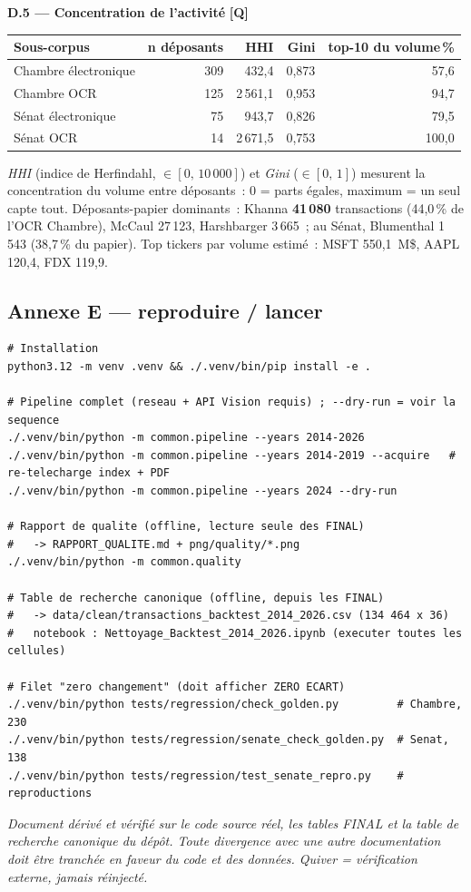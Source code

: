\documentclass[11pt,a4paper]{article}
\begin{document}
\textbf{D.5 — Concentration de l'activité} \hfill {\footnotesize\textbf{[Q]}}
\begin{center}\small
\begin{tabular}{l r rr r}
\toprule
\bfseries Sous-corpus & \bfseries n déposants & \bfseries HHI & \bfseries Gini & \bfseries top-10 du volume\,\%\\
\midrule
{\color{houseC}Chambre électronique} & 309 & 432,4 & 0,873 & 57,6 \\
{\color{houseC}Chambre OCR} & 125 & 2\,561,1 & 0,953 & 94,7 \\
{\color{senateC}Sénat électronique} & 75 & 943,7 & 0,826 & 79,5 \\
{\color{senateC}Sénat OCR} & 14 & 2\,671,5 & 0,753 & 100,0 \\
\bottomrule
\end{tabular}
\end{center}
{\footnotesize \emph{HHI} (indice de Herfindahl, $\in [0,\,10\,000]$) et \emph{Gini} ($\in [0,\,1]$) mesurent
la concentration du volume entre déposants~: 0 = parts égales, maximum = un seul capte tout.
Déposants-papier dominants~: Khanna \textbf{41\,080} transactions (44,0\,\% de l'OCR Chambre), McCaul
27\,123, Harshbarger 3\,665~; au Sénat, Blumenthal 1\,543 (38,7\,\% du papier). Top tickers par volume
estimé~: MSFT 550,1~M\$, AAPL 120,4, FDX 119,9.}

\subsection{Annexe E — reproduire / lancer}
\label{anx:run}
{\footnotesize
\begin{verbatim}
# Installation
python3.12 -m venv .venv && ./.venv/bin/pip install -e .

# Pipeline complet (reseau + API Vision requis) ; --dry-run = voir la sequence
./.venv/bin/python -m common.pipeline --years 2014-2026
./.venv/bin/python -m common.pipeline --years 2014-2019 --acquire   # re-telecharge index + PDF
./.venv/bin/python -m common.pipeline --years 2024 --dry-run

# Rapport de qualite (offline, lecture seule des FINAL)
#   -> RAPPORT_QUALITE.md + png/quality/*.png
./.venv/bin/python -m common.quality

# Table de recherche canonique (offline, depuis les FINAL)
#   -> data/clean/transactions_backtest_2014_2026.csv (134 464 x 36)
#   notebook : Nettoyage_Backtest_2014_2026.ipynb (executer toutes les cellules)

# Filet "zero changement" (doit afficher ZERO ECART)
./.venv/bin/python tests/regression/check_golden.py         # Chambre, 230
./.venv/bin/python tests/regression/senate_check_golden.py  # Senat,   138
./.venv/bin/python tests/regression/test_senate_repro.py    # reproductions
\end{verbatim}}

\vfill
\begin{center}\footnotesize\itshape
Document dérivé et vérifié sur le code source réel, les tables FINAL et la table de recherche canonique du
dépôt. Toute divergence avec une autre documentation doit être tranchée en faveur du code et des données.
Quiver = vérification externe, jamais réinjecté.
\end{center}
\end{document}
